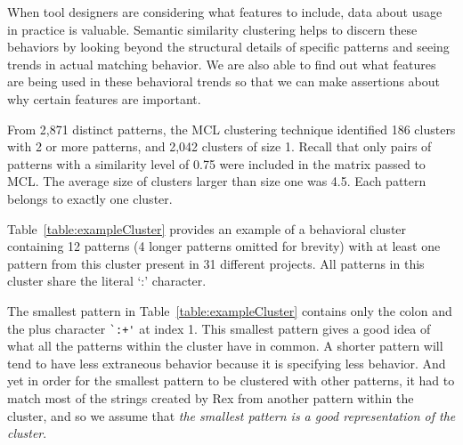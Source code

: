 When tool designers are considering what features to include, data about usage in practice is valuable.  Semantic similarity clustering  helps to discern these behaviors by looking beyond the structural details of specific patterns and seeing trends in actual matching behavior.  We are also able to find out what features are being used in these behavioral trends so that we can make assertions about why certain features are important.

From 2,871 distinct patterns, the MCL clustering technique identified 186 clusters with 2 or more patterns, and 2,042 clusters of size 1.  Recall that only pairs of patterns with a similarity level of 0.75 were included in the matrix passed to MCL.  The average size of clusters larger than size one was 4.5.  Each pattern belongs to exactly one cluster.

Table~\ref{table:exampleCluster} provides an example of a behavioral cluster containing 12 patterns (4 longer patterns omitted for brevity) with at least one pattern from this cluster present in 31 different projects.  All patterns in this cluster share the literal `:' character.


The smallest pattern in Table~\ref{table:exampleCluster} contains only the colon and the plus character \verb!`:+'! at index 1.  This smallest pattern gives a good idea of what all the patterns within the cluster have in common.  A shorter pattern will tend to have less extraneous behavior because it is specifying less behavior.  And yet in order for the smallest pattern to be clustered with other patterns, it had to match most of the strings created by Rex from another pattern within the cluster, and so we assume that \emph{the smallest pattern is a good representation of the cluster}.

